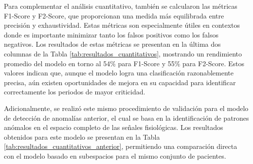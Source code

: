 Para complementar el análisis cuantitativo, también se calcularon las métricas F1-Score y F2-Score, que proporcionan una medida más equilibrada entre precisión y exhaustividad. Estas métricas son especialmente útiles en contextos donde es importante minimizar tanto los falsos positivos como los falsos negativos. Los resultados de estas métricas se presentan en la última dos columnas de la Tabla \ref{tab:resultados_cuantitativos}, mostrando un rendimiento promedio del modelo en torno al 54\% para F1-Score y 55\% para F2-Score. Estos valores indican que, aunque el modelo logra una clasificación razonablemente precisa, aún existen oportunidades de mejora en su capacidad para identificar correctamente los periodos de mayor criticidad.

Adicionalmente, se realizó este mismo procedimiento de validación para el modelo de detección de anomalías anterior, el cual se basa en la identificación de patrones anómalos en el espacio completo de las señales fisiológicas. Los resultados obtenidos para este modelo se presentan en la Tabla \ref{tab:resultados_cuantitativos_anterior}, permitiendo una comparación directa con el modelo basado en subespacios para el mismo conjunto de pacientes.

